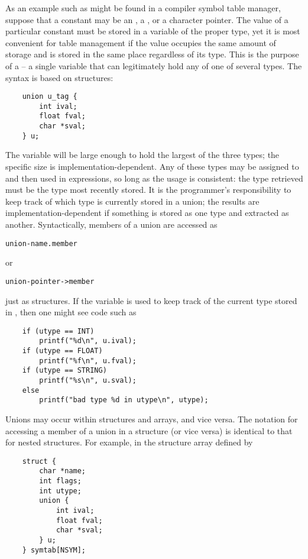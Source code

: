 As an example such as might be found in a compiler symbol table manager, suppose that a constant may be an , a , or a character pointer.
The value of a particular constant must be stored in a variable of the proper type, yet it is most convenient for table management if the value occupies the same amount of storage and is stored in the same place regardless of its type.
This is the purpose of a  -- a single variable that can legitimately hold any of one of several types. The syntax is based on structures:
\begin{lstlisting}
	union u_tag {
		int ival;
		float fval;
		char *sval;
	} u;
\end{lstlisting}
The variable  will be large enough to hold the largest of the three types; the specific size is implementation-dependent.
Any of these types may be assigned to  and then used in expressions, so long as the usage is consistent: the type retrieved must be the type most recently stored.
It is the programmer's responsibility to keep track of which type is currently stored in a union; the results are implementation-dependent if something is stored as one type and extracted as another.
Syntactically, members of a union are accessed as
\begin{lstlisting}[basicstyle=\ttfamily\normalsize\itshape, keywordstyle=\color{black}]
	union-name.member
\end{lstlisting}
or
\begin{lstlisting}[basicstyle=\ttfamily\normalsize\itshape, keywordstyle=\color{black}]
	union-pointer->member
\end{lstlisting}
just as  structures. If the variable  is used to keep track of the current type stored in , then one might see code such as
\begin{lstlisting}
	if (utype == INT)
		printf("%d\n", u.ival);
	if (utype == FLOAT)
		printf("%f\n", u.fval);
	if (utype == STRING)
		printf("%s\n", u.sval);
	else
		printf("bad type %d in utype\n", utype);
\end{lstlisting}
Unions may occur within structures and arrays, and vice versa. The notation for accessing a member of a union in a structure (or vice versa) is identical to that for nested structures.
For example, in the structure array defined by
\begin{lstlisting}
	struct {
		char *name;
		int flags;
		int utype;
		union {
			int ival;
			float fval;
			char *sval;
		} u;
	} symtab[NSYM];
\end{lstlisting}
